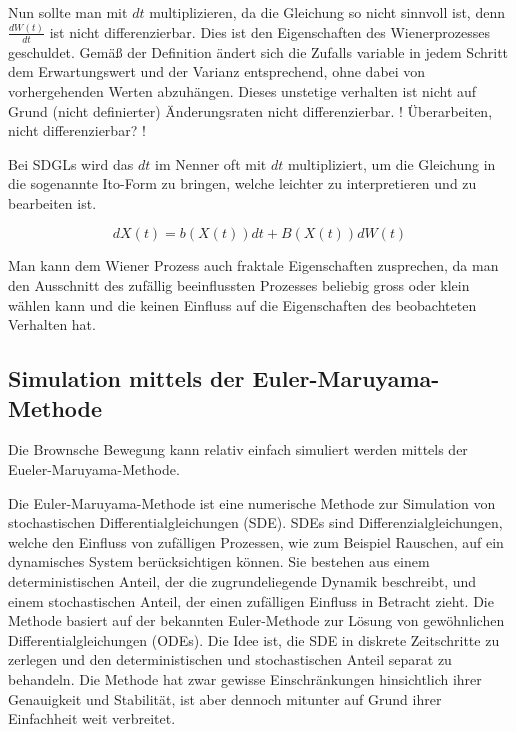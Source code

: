 Nun sollte man mit $ dt $  multiplizieren, da die Gleichung so nicht sinnvoll ist, denn $ \frac{dW(t)}{dt} $ ist nicht differenzierbar. Dies ist den Eigenschaften des Wienerprozesses geschuldet. Gemäß der Definition ändert sich die Zufalls variable in jedem Schritt dem Erwartungswert und der Varianz entsprechend, ohne dabei von vorhergehenden Werten abzuhängen. Dieses unstetige verhalten ist nicht auf Grund (nicht definierter) Änderungsraten nicht differenzierbar.
! Überarbeiten, nicht differenzierbar? ! 

Bei SDGLs wird das $ dt $ im Nenner oft mit $ dt $ multipliziert, um die Gleichung in die sogenannte \glqq{}Ito-Form\glqq{} zu bringen, welche leichter zu interpretieren und zu bearbeiten ist.

\begin{equation}
	dX(t) = b(X(t)) dt + B(X(t)) dW(t)
\end{equation}



Man kann dem Wiener Prozess auch fraktale Eigenschaften zusprechen, da man den Ausschnitt des zufällig beeinflussten Prozesses beliebig gross oder klein wählen kann und die keinen Einfluss auf die Eigenschaften des beobachteten Verhalten hat.


\subsection{Simulation mittels der Euler-Maruyama-Methode
\label{brown:Simulation}}

Die Brownsche Bewegung kann relativ einfach simuliert werden mittels der Eueler-Maruyama-Methode.

Die Euler-Maruyama-Methode ist eine numerische Methode zur Simulation von stochastischen Differentialgleichungen (SDE). SDEs sind Differenzialgleichungen, welche den Einfluss von zufälligen Prozessen, wie zum Beispiel Rauschen, auf ein dynamisches System berücksichtigen können. Sie bestehen aus einem deterministischen Anteil, der die zugrundeliegende Dynamik beschreibt, und einem stochastischen Anteil, der einen zufälligen Einfluss in Betracht zieht. Die Methode basiert auf der bekannten Euler-Methode zur Lösung von gewöhnlichen Differentialgleichungen (ODEs). Die Idee ist, die SDE in diskrete Zeitschritte zu zerlegen und den deterministischen und stochastischen Anteil separat zu behandeln. Die Methode hat zwar gewisse Einschränkungen hinsichtlich ihrer Genauigkeit und Stabilität, ist aber dennoch mitunter auf Grund ihrer Einfachheit weit verbreitet.

